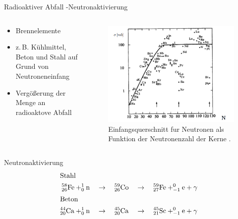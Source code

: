 \begin{frame}{Radioaktiver Abfall -Neutronaktivierung}
  \begin{columns}

    \begin{column}{0.48\textwidth}
      \begin{itemize}
        \setlength\itemsep{1.2em}
        \item{Brennelemente}
        \item{z.\,B. Kühlmittel, Beton und Stahl auf Grund von Neutroneneinfang}
        \item{ Vergößerung der Menge an radioaktove Abfall}
      \end{itemize}
    \end{column}

    \begin{column}{0.48\textwidth}
        \begin{figure}
           \centering
           \includegraphics[width=1.05  \textwidth]{./bilder/einfangwahrscheinlichkeit_neutron.png}
           \caption{Einfangsquerschnitt fur Neutronen als Funktion der Neutronenzahl der Kerne \cite{neutroneneinfang}. }
           \label{ fig: abbau_roboter}
         \end{figure}
    \end{column}

  \end{columns}
\end{frame}



\begin{frame}{Neutronaktivierung}
  \begin{align*}
    \shortintertext{Stahl}
    ^{58}_{26}\ce{Fe}+ ^1_0\mathrm{n }\quad &\rightarrow \quad  ^{59}_{26}\ce{Co} \quad \rightarrow \quad ^{59}_{27}\ce{Fe} + _{-1}^{0}\ce{e}+\gamma \\
  \shortintertext{Beton}
    ^{44}_{20}\ce{Ca}+ ^1_0\mathrm{n }\quad &\rightarrow \quad  ^{45}_{20}\ce{Ca} \quad \rightarrow \quad ^{45}_{21}\ce{Sc} + _{-1}^{0}\ce{e}+\gamma
  \end{align*}
\end{frame}




